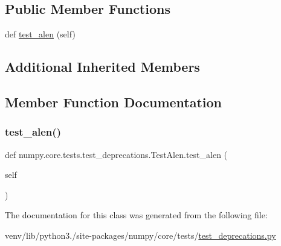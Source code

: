 \subsection*{Public Member Functions}
\begin{DoxyCompactItemize}
\item 
def \hyperlink{classnumpy_1_1core_1_1tests_1_1test__deprecations_1_1TestAlen_a461f581615d9c9b740b5b2ba11e92a40}{test\+\_\+alen} (self)
\end{DoxyCompactItemize}
\subsection*{Additional Inherited Members}


\subsection{Member Function Documentation}
\mbox{\label{classnumpy_1_1core_1_1tests_1_1test__deprecations_1_1TestAlen_a461f581615d9c9b740b5b2ba11e92a40}} 
\subsubsection{\texorpdfstring{test\+\_\+alen()}{test\_alen()}}
{\footnotesize\ttfamily def numpy.\+core.\+tests.\+test\+\_\+deprecations.\+Test\+Alen.\+test\+\_\+alen (\begin{DoxyParamCaption}\item[{}]{self }\end{DoxyParamCaption})}



The documentation for this class was generated from the following file\+:\begin{DoxyCompactItemize}
\item 
venv/lib/python3./site-\/packages/numpy/core/tests/\hyperlink{core_2tests_2test__deprecations_8py}{test\+\_\+deprecations.\+py}\end{DoxyCompactItemize}
